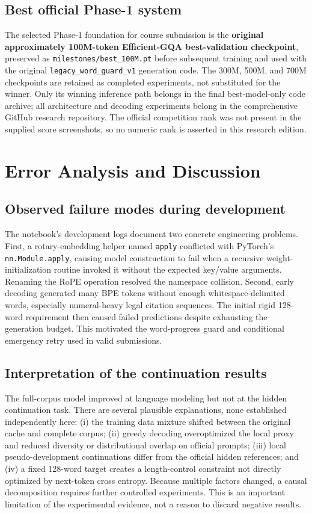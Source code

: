 \documentclass[11pt,a4paper]{article}
\newcommand{\method}[1]{\texttt{#1}}
\begin{document}
\subsection{Best official Phase-1 system}
The selected Phase-1 foundation for course submission is the \textbf{original approximately 100M-token Efficient-GQA best-validation checkpoint}, preserved as \method{milestones/best\_100M.pt} before subsequent training and used with the original \method{legacy\_word\_guard\_v1} generation code. The 300M, 500M, and 700M checkpoints are retained as completed experiments, not substituted for the winner. Only its winning inference path belongs in the final best-model-only code archive; all architecture and decoding experiments belong in the comprehensive GitHub research repository. The official competition rank was not present in the supplied score screenshots, so no numeric rank is asserted in this research edition.

\section{Error Analysis and Discussion}
\subsection{Observed failure modes during development}
The notebook's development logs document two concrete engineering problems. First, a rotary-embedding helper named \method{apply} conflicted with PyTorch's \method{nn.Module.apply}, causing model construction to fail when a recursive weight-initialization routine invoked it without the expected key/value arguments. Renaming the RoPE operation resolved the namespace collision. Second, early decoding generated many BPE tokens without enough whitespace-delimited words, especially numeral-heavy legal citation sequences. The initial rigid 128-word requirement then caused failed predictions despite exhausting the generation budget. This motivated the word-progress guard and conditional emergency retry used in valid submissions.

\subsection{Interpretation of the continuation results}
The full-corpus model improved at language modeling but not at the hidden continuation task. There are several plausible explanations, none established independently here: (i) the training data mixture shifted between the original cache and complete corpus; (ii) greedy decoding overoptimized the local proxy and reduced diversity or distributional overlap on official prompts; (iii) local pseudo-development continuations differ from the official hidden references; and (iv) a fixed 128-word target creates a length-control constraint not directly optimized by next-token cross entropy. Because multiple factors changed, a causal decomposition requires further controlled experiments. This is an important limitation of the experimental evidence, not a reason to discard negative results.
\end{document}
